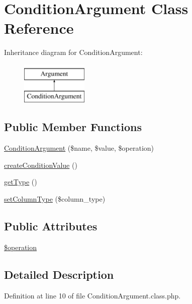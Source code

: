 \hypertarget{classConditionArgument}{\section{Condition\-Argument Class Reference}
\label{classConditionArgument}
}
Inheritance diagram for Condition\-Argument\-:\begin{figure}[H]
\begin{center}
\leavevmode
\includegraphics[height=2.000000cm]{classConditionArgument}
\end{center}
\end{figure}
\subsection*{Public Member Functions}
\begin{DoxyCompactItemize}
\item 
\hyperlink{classConditionArgument_a9adc8c95c5f227954e7b6c46e89a5b65}{Condition\-Argument} (\$name, \$value, \$operation)
\item 
\hyperlink{classConditionArgument_a2f1c182c8765ebc62d2d50f575954982}{create\-Condition\-Value} ()
\item 
\hyperlink{classConditionArgument_a39922137cc67e751a5577850bce3cac7}{get\-Type} ()
\item 
\hyperlink{classConditionArgument_a7ee8444a1bfa4763458a006e0fd6ef1e}{set\-Column\-Type} (\$column\-\_\-type)
\end{DoxyCompactItemize}
\subsection*{Public Attributes}
\begin{DoxyCompactItemize}
\item 
\hyperlink{classConditionArgument_acfccaada47560781bfbdf51086ce3869}{\$operation}
\end{DoxyCompactItemize}


\subsection{Detailed Description}


Definition at line 10 of file Condition\-Argument.\-class.\-php.




